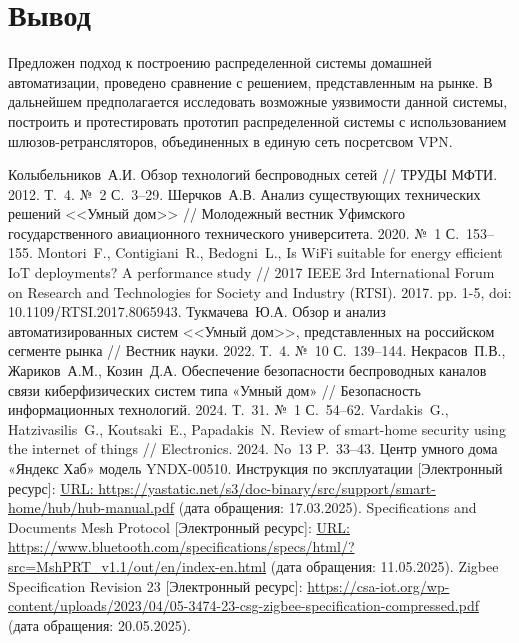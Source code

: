 \documentclass[14pt, a4paper]{extreport}
\begin{document}
\section{Вывод}
Предложен подход к построению распределенной системы домашней автоматизации, проведено сравнение с решением,
представленным на рынке. В дальнейшем предполагается исследовать возможные
уязвимости данной системы, построить и протестировать прототип распределенной системы с использованием шлюзов-ретрансляторов,
объединенных в единую сеть посретсвом VPN.

\newpage
\begin{thebibliography}{40}
 Колыбельников~А.\:И. Обзор технологий беспроводных сетей // ТРУДЫ МФТИ. 2012. Т.~4. №~2 С.~3--29.
 Шерчков~А.\:В. Анализ существующих технических решений <<Умный дом>> // Молодежный вестник Уфимского государственного авиационного технического университета. 2020. №~1 С.~153--155.
 Montori~F., Contigiani~R., Bedogni~L., Is WiFi suitable for energy efficient IoT deployments? A performance study // 2017 IEEE 3rd International Forum on Research and Technologies for Society and Industry (RTSI). 2017. pp. 1-5, doi: 10.1109/RTSI.2017.8065943.
 Тукмачева~Ю.\:А. Обзор и анализ автоматизированных систем <<Умный дом>>, представленных на российском сегменте рынка // Вестник науки. 2022. Т.~4. №~10 С.~139--144.
 Некрасов~П.\:В., Жариков~А.\:М., Козин~Д.\:А. Обеспечение безопасности беспроводных каналов связи киберфизических систем типа «Умный дом» // Безопасность информационных технологий. 2024. Т.~31. №~1 С.~54--62.
 Vardakis~G., Hatzivasilis~G., Koutsaki~E., Papadakis~N. Review of smart-home security using the internet of things // Electronics. 2024. No~13 P.~33--43.
 Центр умного дома «Яндекс Хаб» модель YNDX-00510. Инструкция по эксплуатации [Электронный ресурс]: \url{URL: https://yastatic.net/s3/doc-binary/src/support/smart-home/hub/hub-manual.pdf} (дата обращения: 17.03.2025).
 Specifications and Documents Mesh Protocol [Электронный ресурс]: \url{URL: https://www.bluetooth.com/specifications/specs/html/?src=MshPRT_v1.1/out/en/index-en.html} (дата обращения: 11.05.2025).
 Zigbee Specification Revision 23 [Электронный ресурс]: \url{https://csa-iot.org/wp-content/uploads/2023/04/05-3474-23-csg-zigbee-specification-compressed.pdf} (дата обращения: 20.05.2025).


\end{thebibliography}
\end{document}
